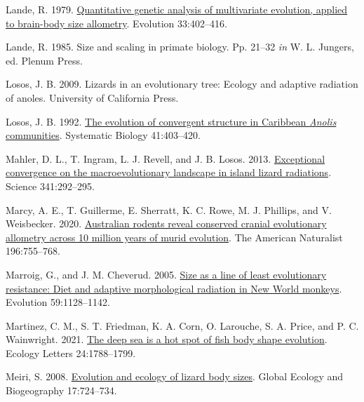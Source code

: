 \documentclass[
  11pt,
]{article}
\newlength{\cslhangindent}
\newlength{\cslentryspacingunit} %
\newenvironment{CSLReferences}[2] %
 {%
  \setlength{\parindent}{0pt}
  \ifodd #1
  \let\oldpar\par
  \def\par{\hangindent=\cslhangindent\oldpar}
  \fi
  \setlength{\parskip}{#2\cslentryspacingunit}
 }%
 {}
\begin{document}
\begin{CSLReferences}{1}{0}
\leavevmode{}%
Lande, R. 1979. \href{https://doi.org/10.2307/2407630}{Quantitative
genetic analysis of multivariate evolution, applied to brain-body size
allometry}. Evolution 33:402--416.

\leavevmode{}%
Lande, R. 1985. Size and scaling in primate biology. Pp. 21--32
\emph{in} W. L. Jungers, ed. Plenum Press.

\leavevmode{}%
Losos, J. B. 2009. Lizards in an evolutionary tree: Ecology and adaptive
radiation of anoles. University of California Press.

\leavevmode{}%
Losos, J. B. 1992. \href{https://doi.org/10.1093/sysbio/41.4.403}{The
evolution of convergent structure in {C}aribbean \emph{{A}nolis}
communities}. Systematic Biology 41:403--420.

\leavevmode{}%
Mahler, D. L., T. Ingram, L. J. Revell, and J. B. Losos. 2013.
\href{https://doi.org/10.1126/science.1232392}{Exceptional convergence
on the macroevolutionary landscape in island lizard radiations}. Science
341:292--295.

\leavevmode{}%
Marcy, A. E., T. Guillerme, E. Sherratt, K. C. Rowe, M. J. Phillips, and
V. Weisbecker. 2020. \href{https://doi.org/10.1086/711398}{Australian
rodents reveal conserved cranial evolutionary allometry across 10
million years of murid evolution}. The American Naturalist 196:755--768.

\leavevmode{}%
Marroig, G., and J. M. Cheverud. 2005.
\href{https://doi.org/10.1111/j.0014-3820.2005.tb01049.x}{Size as a line
of least evolutionary resistance: Diet and adaptive morphological
radiation in {N}ew {W}orld monkeys}. Evolution 59:1128--1142.

\leavevmode{}%
Martinez, C. M., S. T. Friedman, K. A. Corn, O. Larouche, S. A. Price,
and P. C. Wainwright. 2021. \href{https://doi.org/10.1111/ele.13785}{The
deep sea is a hot spot of fish body shape evolution}. Ecology Letters
24:1788--1799.

\leavevmode{}%
Meiri, S. 2008.
\href{https://doi.org/10.1111/j.1466-8238.2008.00414.x}{Evolution and
ecology of lizard body sizes}. Global Ecology and Biogeography
17:724--734.


\end{CSLReferences}
\end{document}
